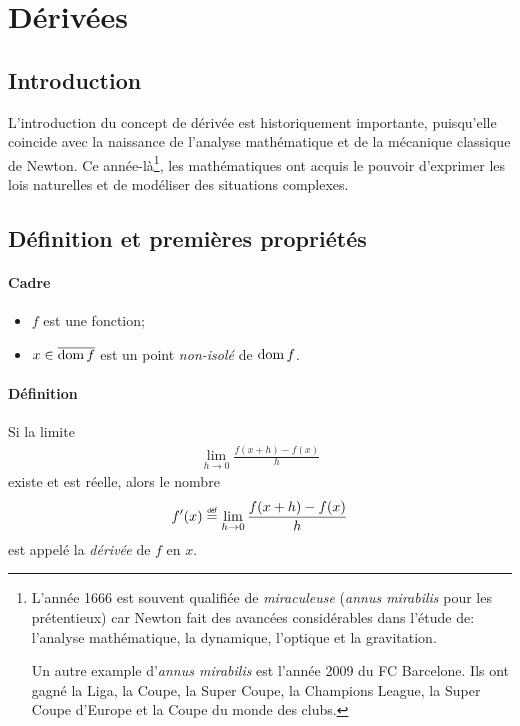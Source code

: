 \documentclass[main.tex]{subfiles}
\begin{document}
\chapter{Dérivées}

\section{Introduction}

L'introduction du concept de dérivée est historiquement importante,
puisqu'elle coincide avec la naissance de l'analyse mathématique et de la mécanique classique de Newton.
Ce année-là\footnote{%
    L'année 1666 est souvent qualifiée de \emph{miraculeuse} (\emph{annus mirabilis} pour les prétentieux)
    car Newton fait des avancées considérables dans l'étude de:
    l'analyse mathématique, la dynamique, l'optique et la gravitation.

    Un autre example d'\emph{annus mirabilis} est l'année 2009 du FC Barcelone.
    Ils ont gagné la Liga, la Coupe, la Super Coupe, la Champions League, la Super Coupe d'Europe et la Coupe du monde des clubs.
},
les mathématiques ont acquis le pouvoir d'exprimer les lois naturelles et de modéliser des situations complexes.

\section{Définition et premières propriétés}

\begin{definition}
    [Dérivée]

    \subsubsection*{Cadre}

    \begin{itemize}
        \item $f$ est une fonction;
        \item $x \in \overline{\operatorname{dom} f}$ est un point \emph{non-isolé} de $\operatorname{dom} f$.
    \end{itemize}

    \subsubsection*{Définition}

    Si la limite
    \begin{align}
        \lim_{h \to 0} \frac {f(x + h) - f(x)} h
    \end{align}
    existe et est réelle,
    alors le nombre
    \begin{align}
        f'(x) \defeq \lim_{h \to 0} \frac {f(x + h) - f(x)} h
    \end{align}
    est appelé la \emph{dérivée} de $f$ en $x$.
\end{definition}
\end{document}

